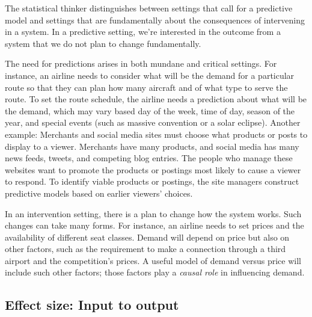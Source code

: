 \documentclass[
  letterpaper,
  DIV=11,
  numbers=noendperiod,
  oneside]{scrartcl}
\begin{document}
\begin{tcolorbox}[enhanced jigsaw, colbacktitle=quarto-callout-note-color!10!white, opacityback=0, breakable, opacitybacktitle=0.6, colback=white, coltitle=black, arc=.35mm, title=\textcolor{quarto-callout-note-color}{\faInfo}\hspace{0.5em}{Intervention versus prediction}, left=2mm, colframe=quarto-callout-note-color-frame, rightrule=.15mm, bottomrule=.15mm, leftrule=.75mm, bottomtitle=1mm, toptitle=1mm, titlerule=0mm, toprule=.15mm]

The statistical thinker distinguishes between settings that call for a
predictive model and settings that are fundamentally about the
consequences of intervening in a system. In a predictive setting, we're
interested in the outcome from a system that we do not plan to change
fundamentally.

The need for predictions arises in both mundane and critical settings.
For instance, an airline needs to consider what will be the demand for a
particular route so that they can plan how many aircraft and of what
type to serve the route. To set the route schedule, the airline needs a
prediction about what will be the demand, which may vary based day of
the week, time of day, season of the year, and special events (such as
massive convention or a solar eclipse). Another example: Merchants and
social media sites must choose what products or posts to display to a
viewer. Merchants have many products, and social media has many news
feeds, tweets, and competing blog entries. The people who manage these
websites want to promote the products or postings most likely to cause a
viewer to respond. To identify viable products or postings, the site
managers construct predictive models based on earlier viewers' choices.

In an intervention setting, there is a plan to change how the system
works. Such changes can take many forms. For instance, an airline needs
to set prices and the availability of different seat classes. Demand
will depend on price but also on other factors, such as the requirement
to make a connection through a third airport and the competition's
prices. A useful model of demand versus price will include such other
factors; those factors play a \emph{causal role} in influencing demand.

\end{tcolorbox}

\subsection{Effect size: Input to
output}\label{effect-size-input-to-output}
\end{document}
